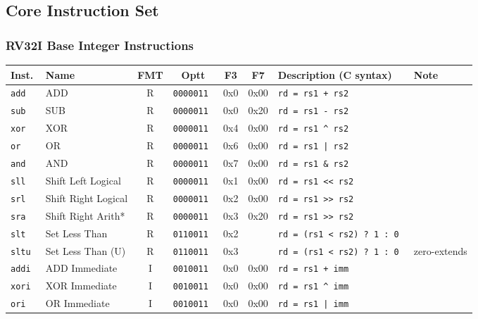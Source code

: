 \subsection*{Core Instruction Set}

\subsubsection*{RV32I Base Integer Instructions}

\begin{tabular}
{l | l | c | c | c | c | l | l}
Inst.       & Name                    & FMT & Optt        & F3  & F7    & Description (C syntax)          & Note     \\ \hline
\tt{add}  & ADD                     & R  & \tt{0000011} & 0x0 & 0x00  & \tt{rd = rs1 + rs2}           & \\
\tt{sub}  & SUB                     & R  & \tt{0000011} & 0x0 & 0x20  & \tt{rd = rs1 - rs2}           & \\
\tt{xor}  & XOR                     & R  & \tt{0000011} & 0x4 & 0x00  & \tt{rd = rs1 \^{} rs2}        & \\
\tt{or}   & OR                      & R  & \tt{0000011} & 0x6 & 0x00  & \tt{rd = rs1 | rs2}           & \\
\tt{and}  & AND                     & R  & \tt{0000011} & 0x7 & 0x00  & \tt{rd = rs1 \& rs2}          & \\
\tt{sll}  & Shift Left Logical      & R  & \tt{0000011} & 0x1 & 0x00  & \tt{rd = rs1 << rs2}          & \\
\tt{srl}  & Shift Right Logical     & R  & \tt{0000011} & 0x2 & 0x00  & \tt{rd = rs1 >> rs2}          & \\
\tt{sra}  & Shift Right Arith*      & R  & \tt{0000011} & 0x3 & 0x20  & \tt{rd = rs1 >> rs2}          & \\ \hline
\tt{slt}  & Set Less Than           & R  & \tt{0110011} & 0x2 &       & \tt{rd = (rs1 < rs2) ? 1 : 0} & \\
\tt{sltu} & Set Less Than (U)       & R  & \tt{0110011} & 0x3 &       & \tt{rd = (rs1 < rs2) ? 1 : 0} & zero-extends \\
\tt{addi} & ADD Immediate           & I  & \tt{0010011} & 0x0 & 0x00  & \tt{rd = rs1 + imm}           & \\
\tt{xori} & XOR Immediate           & I  & \tt{0010011} & 0x0 & 0x00  & \tt{rd = rs1 \^{} imm}        & \\
\tt{ori}  & OR Immediate            & I  & \tt{0010011} & 0x0 & 0x00  & \tt{rd = rs1 | imm}           & \\

\end{tabular}
